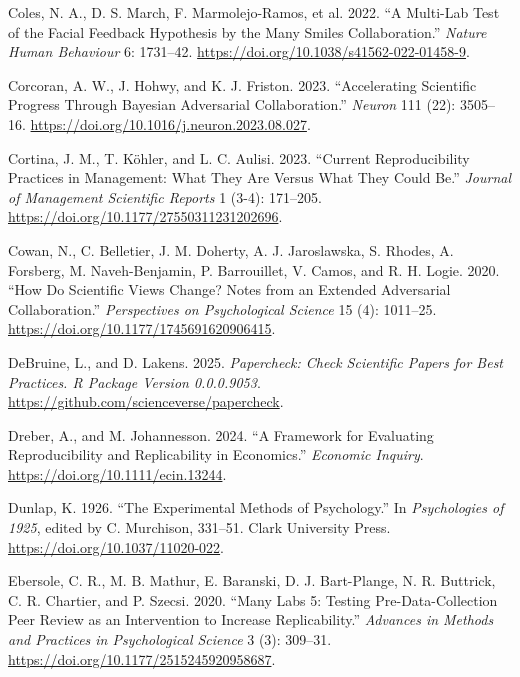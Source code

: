 \documentclass[
  letterpaper,
  DIV=11,
  openany,
  fontsize=12pt,
  parskip=half,
  headings=big,
  numbers=noenddot,
  titlepage=false]{scrreprt}
\newlength{\cslhangindent}
\newenvironment{CSLReferences}[2] %
 {\begin{list}{}{%
  \setlength{\itemindent}{0pt}
  \setlength{\leftmargin}{0pt}
  \setlength{\parsep}{0pt}
  \ifodd #1
   \setlength{\leftmargin}{\cslhangindent}
   \setlength{\itemindent}{-1\cslhangindent}
  \fi
  \setlength{\itemsep}{#2\baselineskip}}}
 {\end{list}}
\begin{document}
\begin{CSLReferences}{1}{0}
Coles, N. A., D. S. March, F. Marmolejo-Ramos, et al. 2022. {``A
Multi-Lab Test of the Facial Feedback Hypothesis by the Many Smiles
Collaboration.''} \emph{Nature Human Behaviour} 6: 1731--42.
\url{https://doi.org/10.1038/s41562-022-01458-9}.

Corcoran, A. W., J. Hohwy, and K. J. Friston. 2023. {``Accelerating
Scientific Progress Through Bayesian Adversarial Collaboration.''}
\emph{Neuron} 111 (22): 3505--16.
\url{https://doi.org/10.1016/j.neuron.2023.08.027}.

Cortina, J. M., T. Köhler, and L. C. Aulisi. 2023. {``Current
Reproducibility Practices in Management: What They Are Versus What They
Could Be.''} \emph{Journal of Management Scientific Reports} 1 (3-4):
171--205. \url{https://doi.org/10.1177/27550311231202696}.

Cowan, N., C. Belletier, J. M. Doherty, A. J. Jaroslawska, S. Rhodes, A.
Forsberg, M. Naveh-Benjamin, P. Barrouillet, V. Camos, and R. H. Logie.
2020. {``How Do Scientific Views Change? Notes from an Extended
Adversarial Collaboration.''} \emph{Perspectives on Psychological
Science} 15 (4): 1011--25.
\url{https://doi.org/10.1177/1745691620906415}.

DeBruine, L., and D. Lakens. 2025. \emph{Papercheck: Check Scientific
Papers for Best Practices. R Package Version 0.0.0.9053}.
\url{https://github.com/scienceverse/papercheck}.

Dreber, A., and M. Johannesson. 2024. {``A Framework for Evaluating
Reproducibility and Replicability in Economics.''} \emph{Economic
Inquiry}. \url{https://doi.org/10.1111/ecin.13244}.

Dunlap, K. 1926. {``The Experimental Methods of Psychology.''} In
\emph{Psychologies of 1925}, edited by C. Murchison, 331--51. Clark
University Press. \url{https://doi.org/10.1037/11020-022}.

Ebersole, C. R., M. B. Mathur, E. Baranski, D. J. Bart-Plange, N. R.
Buttrick, C. R. Chartier, and P. Szecsi. 2020. {``Many Labs 5: Testing
Pre-Data-Collection Peer Review as an Intervention to Increase
Replicability.''} \emph{Advances in Methods and Practices in
Psychological Science} 3 (3): 309--31.
\url{https://doi.org/10.1177/2515245920958687}.


\end{CSLReferences}
\end{document}
